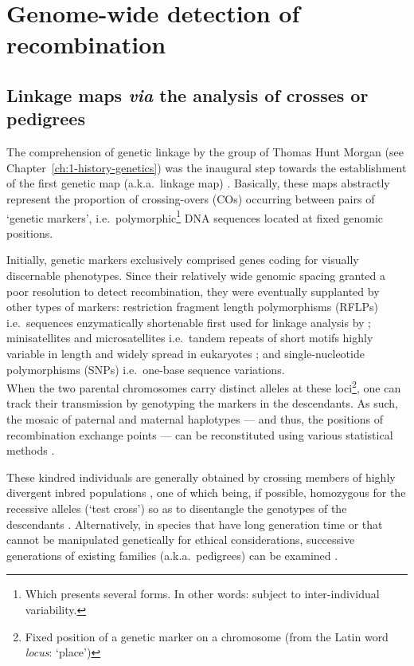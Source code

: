 \section{Genome-wide detection of recombination}

\subsection{Linkage maps \textit{via} the analysis of crosses or pedigrees}
\label{chap3:linkage-maps}

The comprehension of genetic linkage by the group of Thomas Hunt Morgan (see Chapter~\ref{ch:1-history-genetics}) was the inaugural step towards the establishment of the first genetic map (a.k.a.\ linkage map) \citep{sturtevant1913linear}.
Basically, these maps abstractly represent the proportion of crossing-overs (COs) occurring between pairs of ‘genetic markers’, i.e.\ polymorphic\footnote{Which presents several forms. In other words: subject to inter-individual variability.} DNA sequences located at fixed genomic positions.

Initially, genetic markers exclusively comprised genes coding for visually discernable phenotypes.
Since their relatively wide genomic spacing granted a poor resolution to detect recombination, they were eventually supplanted by other types of markers: restriction fragment length polymorphisms (RFLPs) i.e.\ sequences enzymatically shortenable first used for linkage analysis by \citet{botstein1980construction}; minisatellites and microsatellites \citep{hamada1982potential} i.e.\ tandem repeats of short motifs highly variable in length \citep{ellegren2004microsatellites} and widely spread in eukaryotes \citep{hamada1982novel}; and single-nucleotide polymorphisms (SNPs) i.e.\ one-base sequence variations.\\

When the two parental chromosomes carry distinct alleles at these loci\footnote{Fixed position of a genetic marker on a chromosome (from the Latin word \textit{locus}: ‘place’)}, one can track their transmission by genotyping the markers in the descendants.
As such, the mosaic of paternal and maternal haplotypes — and thus, the positions of recombination exchange points — can be reconstituted using various statistical methods \citep[reviewed in \citealp{backstrom2009gene}]{haldane1919combination, kosambi1943estimation}.

These kindred individuals are generally obtained by crossing members of highly divergent inbred populations \citep[e.g.][]{rowe1994maps,dietrich1996comprehensive}, one of which being, if possible, homozygous for the recessive alleles (‘test cross’) so as to disentangle the genotypes of the descendants \citep[reviewed in][]{brown2002mapping}.
Alternatively, in species that have long generation time or that cannot be manipulated genetically for ethical considerations, successive generations of existing families (a.k.a.\ pedigrees) can be examined \citep[e.g.][]{kong2002highresolution,kong2010finescale,cox2009new}.\\

